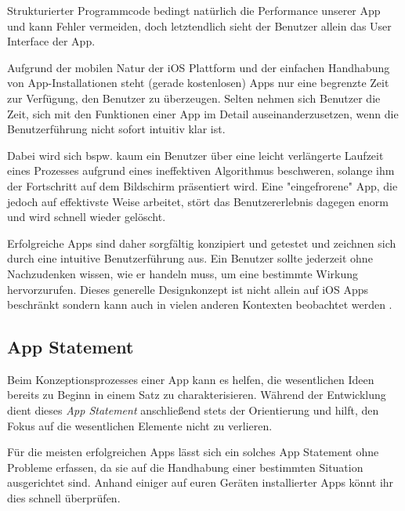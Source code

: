 \documentclass[parskip=half, final]{scrreprt}
\begin{document}
Strukturierter Programmcode bedingt natürlich die Performance unserer App und kann Fehler vermeiden, doch letztendlich sieht der Benutzer allein das User Interface der App.

Aufgrund der mobilen Natur der iOS Plattform und der einfachen Handhabung von App-Installationen steht (gerade kostenlosen) Apps nur eine begrenzte Zeit zur Verfügung, den Benutzer zu überzeugen. Selten nehmen sich Benutzer die Zeit, sich mit den Funktionen einer App im Detail auseinanderzusetzen, wenn die Benutzerführung nicht sofort intuitiv klar ist.

Dabei wird sich bspw. kaum ein Benutzer über eine leicht verlängerte Laufzeit eines Prozesses aufgrund eines ineffektiven Algorithmus beschweren, solange ihm der Fortschritt auf dem Bildschirm präsentiert wird. Eine "{}eingefrorene"{} App, die jedoch auf effektivste Weise arbeitet, stört das Benutzererlebnis dagegen enorm und wird schnell wieder gelöscht.

Erfolgreiche Apps sind daher sorgfältig konzipiert und getestet und zeichnen sich durch eine intuitive Benutzerführung aus. Ein Benutzer sollte jederzeit ohne Nachzudenken wissen, wie er handeln muss, um eine bestimmte Wirkung hervorzurufen. Dieses generelle Designkonzept ist nicht allein auf iOS Apps beschränkt sondern kann auch in vielen anderen Kontexten beobachtet werden .


\subsection{App Statement}

Beim Konzeptionsprozesses einer App kann es helfen, die wesentlichen Ideen bereits zu Beginn in einem Satz zu charakterisieren. Während der Entwicklung dient dieses \emph{App Statement} anschließend stets der Orientierung und hilft, den Fokus auf die wesentlichen Elemente nicht zu verlieren.

Für die meisten erfolgreichen Apps lässt sich ein solches App Statement ohne Probleme erfassen, da sie auf die Handhabung einer bestimmten Situation ausgerichtet sind. Anhand einiger auf euren Geräten installierter Apps könnt ihr dies schnell überprüfen.
\end{document}
